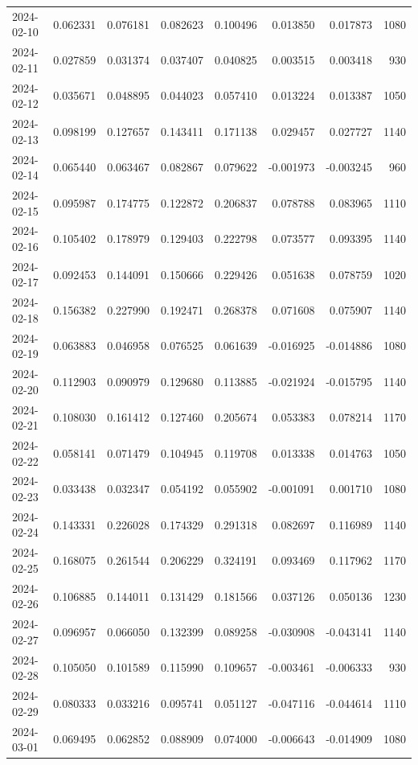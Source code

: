 \begin{tabular}{lrrrrrrr}
2024-02-10 & 0.062331 & 0.076181 & 0.082623 & 0.100496 & 0.013850 & 0.017873 & 1080 \\
2024-02-11 & 0.027859 & 0.031374 & 0.037407 & 0.040825 & 0.003515 & 0.003418 & 930 \\
2024-02-12 & 0.035671 & 0.048895 & 0.044023 & 0.057410 & 0.013224 & 0.013387 & 1050 \\
2024-02-13 & 0.098199 & 0.127657 & 0.143411 & 0.171138 & 0.029457 & 0.027727 & 1140 \\
2024-02-14 & 0.065440 & 0.063467 & 0.082867 & 0.079622 & -0.001973 & -0.003245 & 960 \\
2024-02-15 & 0.095987 & 0.174775 & 0.122872 & 0.206837 & 0.078788 & 0.083965 & 1110 \\
2024-02-16 & 0.105402 & 0.178979 & 0.129403 & 0.222798 & 0.073577 & 0.093395 & 1140 \\
2024-02-17 & 0.092453 & 0.144091 & 0.150666 & 0.229426 & 0.051638 & 0.078759 & 1020 \\
2024-02-18 & 0.156382 & 0.227990 & 0.192471 & 0.268378 & 0.071608 & 0.075907 & 1140 \\
2024-02-19 & 0.063883 & 0.046958 & 0.076525 & 0.061639 & -0.016925 & -0.014886 & 1080 \\
2024-02-20 & 0.112903 & 0.090979 & 0.129680 & 0.113885 & -0.021924 & -0.015795 & 1140 \\
2024-02-21 & 0.108030 & 0.161412 & 0.127460 & 0.205674 & 0.053383 & 0.078214 & 1170 \\
2024-02-22 & 0.058141 & 0.071479 & 0.104945 & 0.119708 & 0.013338 & 0.014763 & 1050 \\
2024-02-23 & 0.033438 & 0.032347 & 0.054192 & 0.055902 & -0.001091 & 0.001710 & 1080 \\
2024-02-24 & 0.143331 & 0.226028 & 0.174329 & 0.291318 & 0.082697 & 0.116989 & 1140 \\
2024-02-25 & 0.168075 & 0.261544 & 0.206229 & 0.324191 & 0.093469 & 0.117962 & 1170 \\
2024-02-26 & 0.106885 & 0.144011 & 0.131429 & 0.181566 & 0.037126 & 0.050136 & 1230 \\
2024-02-27 & 0.096957 & 0.066050 & 0.132399 & 0.089258 & -0.030908 & -0.043141 & 1140 \\
2024-02-28 & 0.105050 & 0.101589 & 0.115990 & 0.109657 & -0.003461 & -0.006333 & 930 \\
2024-02-29 & 0.080333 & 0.033216 & 0.095741 & 0.051127 & -0.047116 & -0.044614 & 1110 \\
2024-03-01 & 0.069495 & 0.062852 & 0.088909 & 0.074000 & -0.006643 & -0.014909 & 1080 \\

\end{tabular}
